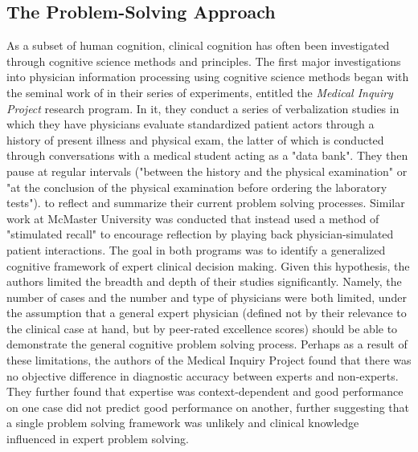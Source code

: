 \subsection{The Problem-Solving Approach}


As a subset of human cognition, clinical cognition has often been investigated through cognitive science methods and principles. The first major investigations into physician information processing using cognitive science methods began with the seminal work of \citet{elstein1978medical} in their series of experiments, entitled the \emph{Medical Inquiry Project} research program. In it, they conduct a series of verbalization studies in which they have physicians evaluate standardized patient actors through a history of present illness and physical exam, the latter of which is conducted through conversations with a medical student acting as a "data bank". They then pause at regular intervals ("between the history and the physical examination" or "at the conclusion of the physical examination before ordering the laboratory tests")\citep{organizationStudyMedicalDiagnostic1970}.  to reflect and summarize their current problem solving processes. Similar work at McMaster University was conducted that instead used a method of "stimulated recall" to encourage reflection by playing back physician-simulated patient interactions. The goal in both programs was to identify a generalized cognitive framework of expert clinical decision making. Given this hypothesis, the authors limited the breadth and depth of their studies significantly. Namely, the number of cases and the number and type of physicians were both limited, under the assumption that a general expert physician (defined not by their relevance to the clinical case at hand, but by peer-rated excellence scores) should be able to demonstrate the general cognitive problem solving process. Perhaps as a result of these limitations, the authors of the Medical Inquiry Project found that there was no objective difference in diagnostic accuracy between experts and non-experts. They further found that expertise was context-dependent and good performance on one case did not predict good performance on another, further suggesting that a single problem solving framework was unlikely and clinical knowledge influenced in expert problem solving. 

